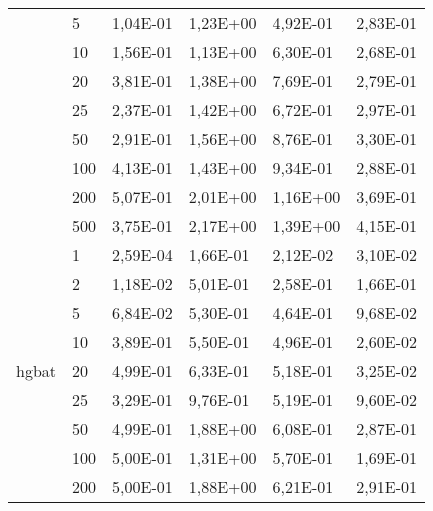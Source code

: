 \begin{longtable}[c]{|p{3.5cm}|l|l|l|l|l|}
                                        & 5         & 1,04E-01   & 1,23E+00   & 4,92E-01   & 2,83E-01  \\ \cline{2-6} 
                                        & 10        & 1,56E-01   & 1,13E+00   & 6,30E-01   & 2,68E-01  \\ \cline{2-6} 
                                        & 20        & 3,81E-01   & 1,38E+00   & 7,69E-01   & 2,79E-01  \\ \cline{2-6} 
                                        & 25        & 2,37E-01   & 1,42E+00   & 6,72E-01   & 2,97E-01  \\ \cline{2-6} 
                                        & 50        & 2,91E-01   & 1,56E+00   & 8,76E-01   & 3,30E-01  \\ \cline{2-6} 
                                        & 100       & 4,13E-01   & 1,43E+00   & 9,34E-01   & 2,88E-01  \\ \cline{2-6} 
                                        & 200       & 5,07E-01   & 2,01E+00   & 1,16E+00   & 3,69E-01  \\ \cline{2-6} 
                                        & 500       & 3,75E-01   & 2,17E+00   & 1,39E+00   & 4,15E-01  \\ \hline
\multirow[t]{10}{*}{hgbat}                 & 1         & 2,59E-04   & 1,66E-01   & 2,12E-02   & 3,10E-02  \\ \cline{2-6} 
                                        & 2         & 1,18E-02   & 5,01E-01   & 2,58E-01   & 1,66E-01  \\ \cline{2-6} 
                                        & 5         & 6,84E-02   & 5,30E-01   & 4,64E-01   & 9,68E-02  \\ \cline{2-6} 
                                        & 10        & 3,89E-01   & 5,50E-01   & 4,96E-01   & 2,60E-02  \\ \cline{2-6} 
                                        & 20        & 4,99E-01   & 6,33E-01   & 5,18E-01   & 3,25E-02  \\ \cline{2-6} 
                                        & 25        & 3,29E-01   & 9,76E-01   & 5,19E-01   & 9,60E-02  \\ \cline{2-6} 
                                        & 50        & 4,99E-01   & 1,88E+00   & 6,08E-01   & 2,87E-01  \\ \cline{2-6} 
                                        & 100       & 5,00E-01   & 1,31E+00   & 5,70E-01   & 1,69E-01  \\ \cline{2-6} 
                                        & 200       & 5,00E-01   & 1,88E+00   & 6,21E-01   & 2,91E-01  \\ \cline{2-6} 

\end{longtable}

